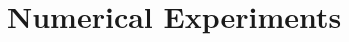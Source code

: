 \documentclass[sigconf]{acmart}
\newtheorem{theorem}{Theorem}[section]
\def\eps{\epsilon}
\def\abs#1{\left|#1  \right|}
\def\norm#1{\left\| #1 \right\|}
\def\calG{\mathcal{G}}
\newcommand\ee{\boldsymbol{\mathit{e}}}
\newcommand\qq{\boldsymbol{\mathit{q}}}
\newcommand\zz{\boldsymbol{\mathit{z}}}
\newcommand\LL{\boldsymbol{\mathit{L}}}
\newcommand\ZZtil{\boldsymbol{\mathit{\tilde{Z}}}}
\newcommand\ZZ{\boldsymbol{\mathit{Z}}}
\newcommand\Otil{\widetilde{O}}
\newcommand{\kh}[1]{\left(#1\right)}
\begin{document}
%
%
%
%	

\section{Numerical Experiments}
\end{document}
